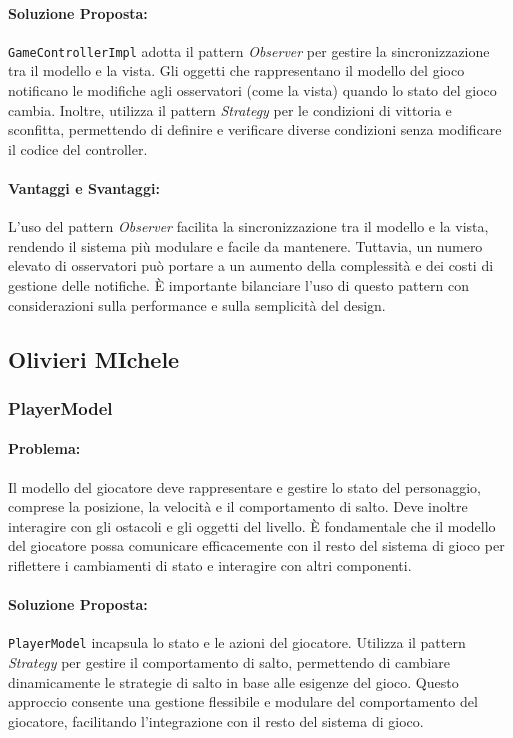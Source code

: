 \documentclass[a4paper,12pt]{report}
\begin{document}
	\paragraph{Soluzione Proposta:} \texttt{GameControllerImpl} adotta il pattern \textit{Observer} per gestire la sincronizzazione tra il modello e la vista. Gli oggetti che rappresentano il modello del gioco notificano le modifiche agli osservatori (come la vista) quando lo stato del gioco cambia. Inoltre, utilizza il pattern \textit{Strategy} per le condizioni di vittoria e sconfitta, permettendo di definire e verificare diverse condizioni senza modificare il codice del controller.
	
	\paragraph{Vantaggi e Svantaggi:} 
	L'uso del pattern \textit{Observer} facilita la sincronizzazione tra il modello e la vista, rendendo il sistema più modulare e facile da mantenere. Tuttavia, un numero elevato di osservatori può portare a un aumento della complessità e dei costi di gestione delle notifiche. È importante bilanciare l'uso di questo pattern con considerazioni sulla performance e sulla semplicità del design.
	
	\subsection{Olivieri MIchele}
	
	\subsubsection{PlayerModel}
	
	\paragraph{Problema:} Il modello del giocatore deve rappresentare e gestire lo stato del personaggio, comprese la posizione, la velocità e il comportamento di salto. Deve inoltre interagire con gli ostacoli e gli oggetti del livello. È fondamentale che il modello del giocatore possa comunicare efficacemente con il resto del sistema di gioco per riflettere i cambiamenti di stato e interagire con altri componenti.
	
	\paragraph{Soluzione Proposta:} \texttt{PlayerModel} incapsula lo stato e le azioni del giocatore. Utilizza il pattern \textit{Strategy} per gestire il comportamento di salto, permettendo di cambiare dinamicamente le strategie di salto in base alle esigenze del gioco. Questo approccio consente una gestione flessibile e modulare del comportamento del giocatore, facilitando l'integrazione con il resto del sistema di gioco.
	
\end{document}
